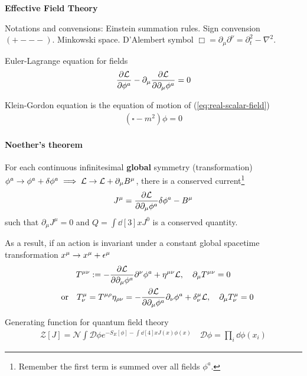 \documentclass[main]{subfiles}
\begin{document}
\begin{center}
    \textbf{Effective Field Theory}
\end{center}

\begin{multicols}{2}
Notations and convensions:
Einstein summation rules. Sign convension $(+---)$. Minkowski space. D'Alembert symbol $\Box = \partial_\mu\partial^\nu = \partial_t^2 - \nabla^2$.

Euler-Lagrange equation for fields
\begin{gather}
    \pdv{\mathcal{L}}{\phi^a} - \partial_\mu\pdv{\mathcal{L}}{\partial_\mu \phi^a} = 0
\end{gather}

Klein-Gordon equation is the equation of motion of (\ref{eq:real-scalar-field})
\begin{gather}
    (\square - m^2)\phi = 0
\end{gather}

\paragraph{Noether's theorem} For each continuous infinitesimal \textbf{global} symmetry (transformation) $\phi^a \rightarrow \phi^a + \delta \phi^a \implies \mathcal{L} \rightarrow \mathcal{L} + \partial_{\mu}B^\mu$, there is a conserved current\footnote{Remember the first term is summed over all fields $\phi^a$.}
\begin{gather}
    J^\mu = \pdv{\mathcal{L}}{\partial_\mu\phi^a}\delta\phi^a - B^\mu
\end{gather}
such that $\partial_\mu J^\mu = 0$ and $Q = \int \dd[3]{x} J^0$ is a conserved quantity.

As a result, if an action is invariant under a constant global spacetime transformation $x^\mu \rightarrow x^\mu + \epsilon^\mu$
\begin{gather}
    T^{\mu\nu} := - \pdv{\La}{\partial_\mu\phi^a} \partial^\nu \phi^a + \eta^{\mu\nu}\mathcal{L} ,\quad \partial_{\mu } T^{\mu\nu} = 0\\
    \qq{or} T^\mu_\nu = T^{\mu\rho}\eta_{\rho\nu} = - \pdv{\La}{\partial_\mu\phi^a} \partial_\nu \phi^a + \delta^\mu_\nu\mathcal{L} ,\quad \partial_\mu T^\mu_\nu = 0
\end{gather}

Generating function for quantum field theory
\begin{gather}
\mathcal{Z}[J] = \mathcal{N} \int\mathcal{D}\phi e^{-S_E[\phi] - \int\dd[4]{x}J(x)\phi(x)} \quad \mathcal{D} \phi = \prod_i \dd{\phi(x_{i})}
\end{gather}

\end{multicols}
\end{document}
